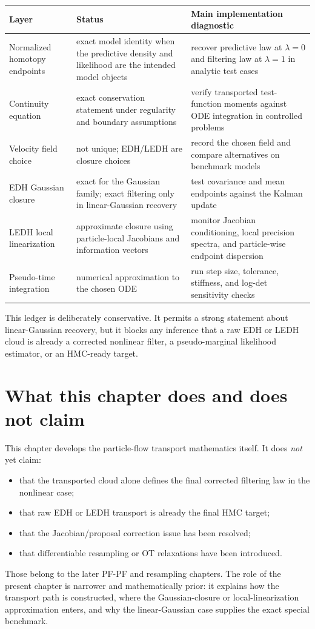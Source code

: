 \begin{center}
\small
\begin{tabular}{p{} p{} p{}}
\toprule
Layer & Status & Main implementation diagnostic \\
\midrule
Normalized homotopy endpoints & exact model identity when the predictive
density and likelihood are the intended model objects & recover predictive law
at $\lambda=0$ and filtering law at $\lambda=1$ in analytic test cases \\
Continuity equation & exact conservation statement under regularity and
boundary assumptions & verify transported test-function moments against ODE
integration in controlled problems \\
Velocity field choice & not unique; EDH/LEDH are closure choices & record the
chosen field and compare alternatives on benchmark models \\
EDH Gaussian closure & exact for the Gaussian family; exact filtering only in
linear-Gaussian recovery & test covariance and mean endpoints against the
Kalman update \\
LEDH local linearization & approximate closure using particle-local Jacobians
and information vectors & monitor Jacobian conditioning, local precision
spectra, and particle-wise endpoint dispersion \\
Pseudo-time integration & numerical approximation to the chosen ODE & run step
size, tolerance, stiffness, and log-det sensitivity checks \\
\bottomrule
\end{tabular}
\end{center}

This ledger is deliberately conservative.  It permits a strong statement about
linear-Gaussian recovery, but it blocks any inference that a raw EDH or LEDH
cloud is already a corrected nonlinear filter, a pseudo-marginal likelihood
estimator, or an HMC-ready target.

\section{What this chapter does and does not claim}
\label{sec:bf-pff-chapter-boundary}

This chapter develops the particle-flow transport mathematics itself.  It does
\emph{not} yet claim:
\begin{itemize}
  \item that the transported cloud alone defines the final corrected filtering
    law in the nonlinear case;
  \item that raw EDH or LEDH transport is already the final HMC target;
  \item that the Jacobian/proposal correction issue has been resolved;
  \item that differentiable resampling or OT relaxations have been introduced.
\end{itemize}
Those belong to the later PF-PF and resampling chapters.  The role of the
present chapter is narrower and mathematically prior: it explains how the
transport path is constructed, where the Gaussian-closure or local-linearization
approximation enters, and why the linear-Gaussian case supplies the exact
special benchmark.
